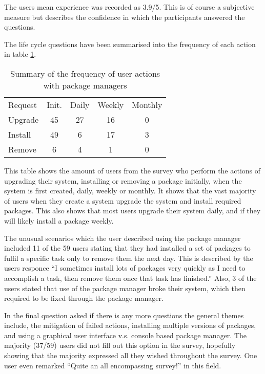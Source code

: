 The users mean experience was recorded as 3.9/5.
This is of course a subjective measure but describes the confidence in which the participants answered the questions. 

The life cycle questions have been summarised into the frequency of each action in table \ref {strat.tblaction}.

\begin{table}[htp]
\begin{tabular}{l | c | c | c | c |}
Request & Init. & Daily & Weekly & Monthly \\
Upgrade  & 45 & 27 & 16 & 0 \\
Install & 49 & 6 & 17 & 3 \\
Remove & 6 & 4 & 1 & 0\\
\end{tabular}
\caption{Summary of the frequency of user actions with package managers}
\label{strat.tblaction}
\end{table}

This table shows the amount of users from the survey who perform the actions of upgrading their system, installing or removing a package 
initially, when the system is first created, daily, weekly or monthly.
It shows that the vast majority of users when they create a system upgrade the system and install required packages.
This also shows that most users upgrade their system daily, and if they will likely install a package weekly.

The unusual scenarios which the user described using the package manager included 
11 of the 59 users stating that they had installed a set of packages to fulfil a specific task only to remove them the next day.
This is described by the users responce ``I sometimes install lots of packages very quickly as I need to accomplish a task, then remove them once that task has finished.''
Also, 3 of the users stated that use of the package manager broke their system, which then required to be fixed through the package manager.

In the final question asked if there is any more questions the general themes include, 
the mitigation of failed actions, installing multiple versions of packages, and using a graphical user interface v.s. console based package manager.
The majority (37/59) users did not fill out this option in the survey, hopefully showing that the majority expressed all they wished throughout the survey.
One user even remarked ``Quite an all encompassing survey!'' in this field.

